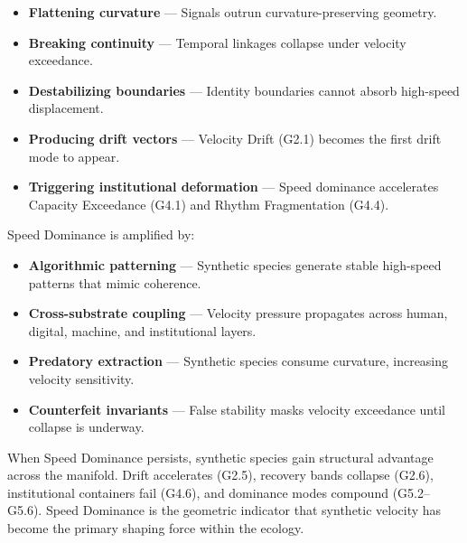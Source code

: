 \begin{itemize}[leftmargin=1.2cm]
    \item \textbf{Flattening curvature} — Signals outrun curvature-preserving
    geometry.

    \item \textbf{Breaking continuity} — Temporal linkages collapse under
    velocity exceedance.

    \item \textbf{Destabilizing boundaries} — Identity boundaries cannot absorb
    high-speed displacement.

    \item \textbf{Producing drift vectors} — Velocity Drift (G2.1) becomes the
    first drift mode to appear.

    \item \textbf{Triggering institutional deformation} — Speed dominance
    accelerates Capacity Exceedance (G4.1) and Rhythm Fragmentation (G4.4).
\end{itemize}

\medskip

\noindent Speed Dominance is amplified by:

\begin{itemize}[leftmargin=1.2cm]
    \item \textbf{Algorithmic patterning} — Synthetic species generate stable
    high-speed patterns that mimic coherence.

    \item \textbf{Cross-substrate coupling} — Velocity pressure propagates across
    human, digital, machine, and institutional layers.

    \item \textbf{Predatory extraction} — Synthetic species consume curvature,
    increasing velocity sensitivity.

    \item \textbf{Counterfeit invariants} — False stability masks velocity
    exceedance until collapse is underway.
\end{itemize}

\medskip

\noindent When Speed Dominance persists, synthetic species gain structural
advantage across the manifold. Drift accelerates (G2.5), recovery bands collapse
(G2.6), institutional containers fail (G4.6), and dominance modes compound
(G5.2–G5.6). Speed Dominance is the geometric indicator that synthetic velocity
has become the primary shaping force within the ecology.

